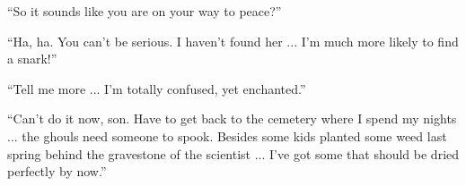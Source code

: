 ``So it sounds like you are on your way to peace?''

``Ha, ha. You can't be serious. I haven't found her ... I'm much more likely to find a snark!''

``Tell me more ... I'm totally confused, yet enchanted.''

``Can't do it now, son. Have to get back to the cemetery where I spend my nights ... the ghouls need someone to spook. Besides some kids planted some weed last spring behind the gravestone of the scientist
... I've got some that should be dried perfectly by now.''


